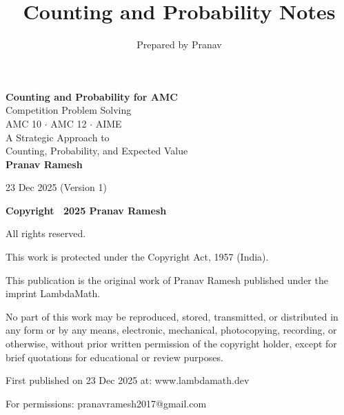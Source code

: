 \documentclass[12pt]{extarticle}
\title{Counting and Probability Notes}
\author{Prepared by Pranav}
\date{}
\begin{document}
\begin{titlepage}
\centering
\vspace*{2cm}

{\Huge\bfseries Counting and Probability for AMC}\\[0.5cm]
{\Large Competition Problem Solving}\\[2cm]

{\large AMC 10 $\cdot$ AMC 12 $\cdot$ AIME}\\[3cm]

{\Large A Strategic Approach to\\[0.3cm]
Counting, Probability, and Expected Value}\\[3cm]

{\Large\textbf{Pranav Ramesh}}\\[3cm]

\vfill

{\large 23 Dec 2025 (Version 1)}
\end{titlepage}

\thispagestyle{empty}
\vspace*{\fill}
\begin{center}
\textbf{\Large Copyright \textcopyright\ 2025 Pranav Ramesh}

All rights reserved.

This work is protected under the Copyright Act, 1957 (India).

\vspace{1.5cm}

This publication is the original work of Pranav Ramesh published under the imprint LambdaMath.

\vspace{1.5cm}

No part of this work may be reproduced, stored, transmitted, or distributed in any form or by any means, electronic, mechanical, photocopying, recording, or otherwise, without prior written permission of the copyright holder, except for brief quotations for educational or review purposes.

\vspace{1.5cm}

First published on 23 Dec 2025 at: www{.}lambdamath{.}dev

For permissions: pranavramesh2017@gmail{.}com
\end{center}
\vspace*{\fill}

\newpage
\end{document}
